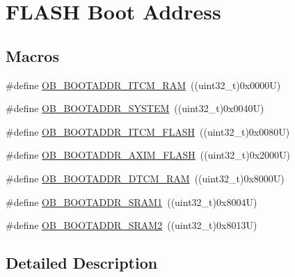 \hypertarget{group___f_l_a_s_h_ex___boot___address}{}\section{F\+L\+A\+SH Boot Address}
\label{group___f_l_a_s_h_ex___boot___address}
\subsection*{Macros}
\begin{DoxyCompactItemize}
\item 
\#define \mbox{\hyperlink{group___f_l_a_s_h_ex___boot___address_gae797c2f1d768d2510c0e65a099fc3ae5}{O\+B\+\_\+\+B\+O\+O\+T\+A\+D\+D\+R\+\_\+\+I\+T\+C\+M\+\_\+\+R\+AM}}~((uint32\+\_\+t)0x0000\+U)
\item 
\#define \mbox{\hyperlink{group___f_l_a_s_h_ex___boot___address_ga8d50c2bc93901d6a9f5aefa39222a214}{O\+B\+\_\+\+B\+O\+O\+T\+A\+D\+D\+R\+\_\+\+S\+Y\+S\+T\+EM}}~((uint32\+\_\+t)0x0040\+U)
\item 
\#define \mbox{\hyperlink{group___f_l_a_s_h_ex___boot___address_gaea77a4354df992be1506926df57c2874}{O\+B\+\_\+\+B\+O\+O\+T\+A\+D\+D\+R\+\_\+\+I\+T\+C\+M\+\_\+\+F\+L\+A\+SH}}~((uint32\+\_\+t)0x0080\+U)
\item 
\#define \mbox{\hyperlink{group___f_l_a_s_h_ex___boot___address_ga71dbc64420d7b5cd38400bd654755a79}{O\+B\+\_\+\+B\+O\+O\+T\+A\+D\+D\+R\+\_\+\+A\+X\+I\+M\+\_\+\+F\+L\+A\+SH}}~((uint32\+\_\+t)0x2000\+U)
\item 
\#define \mbox{\hyperlink{group___f_l_a_s_h_ex___boot___address_ga92bac256ef970f2311497027287c6512}{O\+B\+\_\+\+B\+O\+O\+T\+A\+D\+D\+R\+\_\+\+D\+T\+C\+M\+\_\+\+R\+AM}}~((uint32\+\_\+t)0x8000\+U)
\item 
\#define \mbox{\hyperlink{group___f_l_a_s_h_ex___boot___address_ga09357310fe2e2fa07325c97d3b8f5fda}{O\+B\+\_\+\+B\+O\+O\+T\+A\+D\+D\+R\+\_\+\+S\+R\+A\+M1}}~((uint32\+\_\+t)0x8004\+U)
\item 
\#define \mbox{\hyperlink{group___f_l_a_s_h_ex___boot___address_ga3d8f5bea60a549c9daf4340d47193c09}{O\+B\+\_\+\+B\+O\+O\+T\+A\+D\+D\+R\+\_\+\+S\+R\+A\+M2}}~((uint32\+\_\+t)0x8013\+U)
\end{DoxyCompactItemize}


\subsection{Detailed Description}


